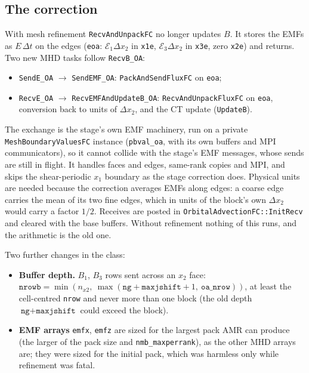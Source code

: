 \documentclass[11pt]{article}
\newcommand{\code}[1]{\texttt{#1}}
\newcommand{\fn}[1]{\texttt{\small #1}}
\begin{document}
\subsection{The correction}
With mesh refinement \fn{RecvAndUnpackFC} no longer updates $B$. It stores the EMFs as
$E\,\Delta t$ on the edges (\code{eoa}: $\mathcal E_1\Delta x_2$ in \code{x1e},
$\mathcal E_3\Delta x_2$ in \code{x3e}, zero \code{x2e}) and returns. Two new MHD tasks
follow \fn{RecvB\_OA}:
\begin{itemize}\itemsep2pt
\item \fn{SendE\_OA} $\to$ \fn{SendEMF\_OA}: \fn{PackAndSendFluxFC} on \code{eoa};
\item \fn{RecvE\_OA} $\to$ \fn{RecvEMFAndUpdateB\_OA}: \fn{RecvAndUnpackFluxFC} on
      \code{eoa}, conversion back to units of $\Delta x_2$, and the CT update
      (\fn{UpdateB}).
\end{itemize}
The exchange is the stage's own EMF machinery, run on a private
\fn{MeshBoundaryValuesFC} instance (\code{pbval\_oa}, with its own buffers and MPI
communicators), so it cannot collide with the stage's EMF messages, whose sends are still
in flight. It handles faces and edges, same-rank copies and MPI, and skips the
shear-periodic $x_1$ boundary as the stage correction does. Physical units are needed
because the correction averages EMFs along edges: a coarse edge carries the mean of its two
fine edges, which in units of the block's own $\Delta x_2$ would carry a factor $1/2$.
Receives are posted in \fn{OrbitalAdvectionFC::InitRecv} and cleared with the base
buffers. Without refinement nothing of this runs, and the arithmetic is the old one.

\noindent
Two further changes in the class:
\begin{itemize}\itemsep2pt
\item \textbf{Buffer depth.} $B_1$, $B_3$ rows sent across an $x_2$ face:
      $\code{nrowb} = \min(n_{x2},\ \max(\code{ng} + \code{maxjshift} + 1,\
      \code{oa\_nrow}))$, at least the cell-centred \code{nrow} and never more than one
      block (the old depth $\code{ng} + \code{maxjshift}$ could exceed the block).
\item \textbf{EMF arrays} \code{emfx}, \code{emfz} are sized for the largest pack AMR
      can produce (the larger of the pack size and \code{nmb\_maxperrank}), as the other
      MHD arrays are;
      they were sized for the initial pack, which was harmless only while refinement was
      fatal.
\end{itemize}
\end{document}
